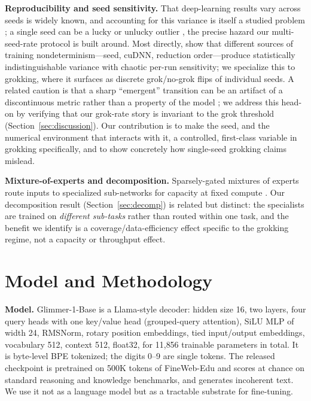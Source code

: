 \documentclass[10pt]{article} %
\begin{document}
\textbf{Reproducibility and seed sensitivity.} That deep-learning results vary across seeds is
widely known, and accounting for this variance is itself a studied problem
\citep{bouthillier2021variance}; a single seed can be a lucky or unlucky outlier
\citep{picard2021torch}, the precise hazard our multi-seed-rate protocol is built around. Most
directly, \citet{summers2021nondeterminism} show that different sources of training
nondeterminism---seed, cuDNN, reduction order---produce statistically indistinguishable variance
with chaotic per-run sensitivity; we specialize this to grokking, where it surfaces as discrete
grok/no-grok flips of individual seeds. A related
caution is that a sharp ``emergent'' transition can be
an artifact of a discontinuous metric rather than a property of the model
\citep{schaeffer2023mirage}; we address this head-on by verifying that our grok-rate story is
invariant to the grok threshold (Section~\ref{sec:discussion}). Our contribution is to make the
seed, and the numerical environment that interacts with it, a controlled, first-class variable in
grokking specifically, and to show concretely how single-seed grokking claims mislead.

\textbf{Mixture-of-experts and decomposition.} Sparsely-gated mixtures of experts route inputs to
specialized sub-networks for capacity at fixed compute \citep{shazeer2017moe,fedus2022switch}. Our
decomposition result (Section~\ref{sec:decomp}) is related but distinct: the specialists are
trained on \emph{different sub-tasks} rather than routed within one task, and the benefit we
identify is a coverage/data-efficiency effect specific to the grokking regime, not a capacity or
throughput effect.

\section{Model and Methodology}
\label{sec:method}

\textbf{Model.} Glimmer-1-Base is a Llama-style decoder: hidden size 16, two layers, four query
heads with one key/value head (grouped-query attention), SiLU MLP of width 24, RMSNorm, rotary
position embeddings, tied input/output embeddings, vocabulary 512, context 512, float32, for
11{,}856 trainable parameters in total. It is byte-level BPE tokenized; the digits 0--9 are single
tokens. The released checkpoint is pretrained on 500K tokens of FineWeb-Edu and scores at chance
on standard reasoning and knowledge benchmarks, and generates incoherent text. We use it not as a
language model but as a tractable substrate for fine-tuning.
\end{document}
